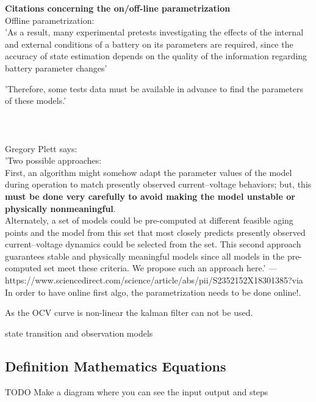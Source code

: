 \textbf{Citations concerning the on/off-line parametrization} \\

Offline parametrization: \\
'As a result, many experimental pretests investigating the
effects of the internal and external conditions of a battery on its parameters are required, since the
accuracy of state estimation depends on the quality of the information regarding battery parameter
changes'

'Therefore, some tests data must be available in 
advance to find the parameters of these models.'
\cite{hussein2011overview}  \\ \\ \\ \\

Gregory Plett says: \\
'Two possible approaches: \\

First, an algorithm might somehow adapt the parameter values of the model during operation to match presently observed current–voltage behaviors; but, this \textbf{must be done very carefully to avoid making the model unstable or physically nonmeaningful}. \\

Alternately, a set of models could be pre-computed at different feasible aging points and the model from this set that most closely predicts presently observed current–voltage dynamics could be selected from the set. This second approach guarantees stable and physically meaningful models since all models in the pre-computed set meet these criteria. We propose such an approach here.' 
---https://www.sciencedirect.com/science/article/abs/pii/S2352152X18301385?via%
In order to have online first algo, the parametrization needs to be done online!. 

As the OCV curve is non-linear the kalman filter can not be used. 

state transition and observation models


\subsection{Definition Mathematics Equations }
 
TODO Make a diagram where you can see the input output and steps\\



